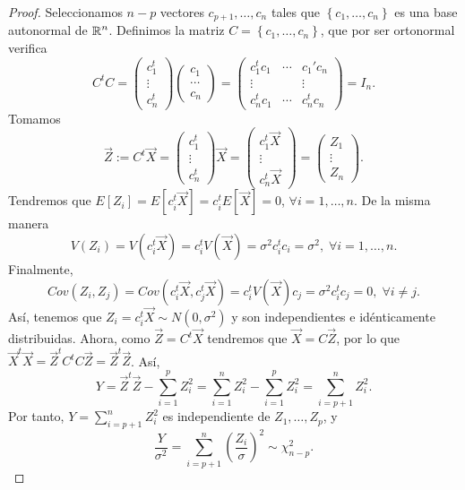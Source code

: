 \begin{proof}
	Seleccionamos $\displaystyle n-p $ vectores $\displaystyle c_{p+1}, \ldots, c_{n} $ tales que $\displaystyle \left\{ c_{1}, \ldots, c_{n}\right\}  $ es una base autonormal de $\displaystyle \mathbb{R}^{n} $. Definimos la matriz $\displaystyle C = \left\{ c_{1}, \ldots, c_{n}\right\}  $, que por ser ortonormal verifica 
	\[C^{t}C =\begin{pmatrix} c_{1}^{t} \\ \vdots \\ c_{n}^{t} \end{pmatrix}\begin{pmatrix} c_{1} \\ \cdots \\ c_{n} \end{pmatrix}=\begin{pmatrix} c_{1}^{t}c_{1} & \cdots & c_{1}'c_{n} \\ \vdots & & \vdots \\ c_{n}^{t}c_{1} & \cdots & c_{n}^{t}c_{n} \end{pmatrix}=I_{n}.\]
Tomamos 
\[\vec{Z} := C^{t}\vec{X}= \begin{pmatrix} c_{1}^{t} \\ \vdots \\ c_{n}^{t} \end{pmatrix}\vec{X}=\begin{pmatrix} c_{1}^{t}\vec{X} \\ \vdots \\ c_{n}^{t}\vec{X} \end{pmatrix}=\begin{pmatrix} Z_{1} \\ \vdots \\ Z_{n} \end{pmatrix} .\]
Tendremos que $\displaystyle E\left[Z_{i}\right] =E\left[c_{i}^{t}\vec{X}\right] =c_{i}^{t}E\left[\vec{X}\right] =0 $, $\displaystyle \forall i = 1, \ldots, n $. De la misma manera
\[V\left(Z_{i}\right)=V\left(c^{t}_{i}\vec{X}\right)=c_{i}^{t}V\left(\vec{X}\right)=\sigma^{2}c_{i}^{t}c_{i}=\sigma^{2}, \; \forall i = 1, \ldots, n .\]
Finalmente, 
\[Cov\left(Z_{i}, Z_{j}\right)=Cov\left(c_{i}^{t}\vec{X}, c_{j}^{t}\vec{X}\right)=c_{i}^{t}V\left(\vec{X}\right)c_{j}=\sigma^{2}c_{i}^{t}c_{j} = 0, \; \forall i \neq j .\]
Así, tenemos que $\displaystyle Z_{i}=c_{i}^{t}\vec{X} \sim N\left(0, \sigma^{2}\right)$ y son independientes e idénticamente distribuidas. Ahora, como $\displaystyle \vec{Z}=C^{t}\vec{X} $ tendremos que $\displaystyle \vec{X}=C\vec{Z} $, por lo que $\displaystyle \vec{X}^{t}\vec{X}=\vec{Z}^{t}C^{t}C\vec{Z}=\vec{Z}^{t}\vec{Z} $. Así,
\[Y = \vec{Z}^{t}\vec{Z}-\sum^{p}_{i = 1}Z_{i}^{2}=\sum^{n}_{i = 1}Z_{i}^{2}-\sum^{p}_{i = 1}Z_{i}^{2}=\sum^{n}_{i = p + 1}Z_{i}^{2} .\]
Por tanto, $\displaystyle Y = \sum^{n}_{i = p + 1}Z_{i}^{2} $ es independiente de $\displaystyle Z_{1}, \ldots, Z_{p} $, y 
\[\frac{Y}{\sigma^{2}}=\sum^{n}_{i = p + 1}\left(\frac{Z_{i}}{\sigma }\right)^{2}\sim \chi^{2}_{n-p} .\]
\end{proof}

